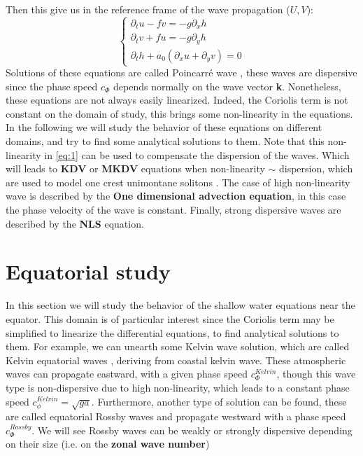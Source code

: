 \documentclass[11pt,a4paper]{report}
\begin{document}
\begin{multicols}{2}
    Then this give us in the reference frame of the wave propagation ($U,V$):
    \begin{equation} \label{eq:1}
        \begin{cases}
            \partial_t u  - fv = -g \partial_x h \\
            \partial_t v + fu = -g \partial_y h  \\
            \partial_t h + a_0( \partial_x u + \partial_y v) = 0
        \end{cases}
    \end{equation}
    Solutions of these equations are called Poincarré wave \cite{water}, these waves are dispersive since the phase speed $c_\Phi$ depends normally on the wave vector \textbf{k}.
    Nonetheless, these equations are not always easily linearized. Indeed, the Coriolis term is not constant on the domain of study, this brings some non-linearity in the equations. In the following we will study the behavior of these equations on different domains, and try to find some analytical solutions to them.
    Note that this non-linearity in \ref{eq:1} can be used to compensate the dispersion of the waves. Which will leads to \textbf{KDV} or \textbf{MKDV} equations when non-linearity $\sim$ dispersion, which are used to model one crest unimontane solitons \cite{Boyd80}. The case of high non-linearity wave is described by the \textbf{One dimensional advection equation}, in this case the phase velocity of the wave is constant.
    Finally, strong dispersive waves are described by the \textbf{NLS} equation.
    \section{Equatorial study}

    In this section we will study the behavior of the shallow water equations near the equator. This domain is of particular interest since the Coriolis term may be simplified to linearize the differential equations, to find analytical solutions to them.
    For example,  we can unearth some Kelvin wave solution, which are called Kelvin equatorial waves \cite{Holton}, deriving from coastal kelvin wave. These atmospheric waves can propagate eastward, with a given phase speed $c_\Phi^{Kelvin}$, though this wave type is non-dispersive due to high non-linearity, which leads to a constant phase speed $c_\phi^{Kelvin} = \sqrt{ga}$. Furthermore, another type of solution can be found, these are called equatorial Rossby waves and propagate westward with a phase speed $c_\Phi^{Rossby}$. We will see Rossby waves can be weakly or strongly dispersive depending on their size (i.e. on the \textbf{zonal wave number})


\end{multicols}
\end{document}
